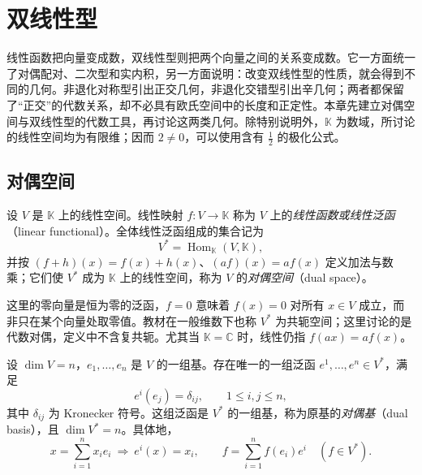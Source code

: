 \setcounter{chapter}{9} %
\chapter{双线性型}
\label{chap:bilinear-forms}

线性函数把向量变成数，双线性型则把两个向量之间的关系变成数。它一方面统一了对偶配对、二次型和实内积，另一方面说明：改变双线性型的性质，就会得到不同的几何。非退化对称型引出正交几何，非退化交错型引出辛几何；两者都保留了“正交”的代数关系，却不必具有欧氏空间中的长度和正定性。本章先建立对偶空间与双线性型的代数工具，再讨论这两类几何。除特别说明外，$\mathbb K$ 为数域，所讨论的线性空间均为有限维；因而 $2\neq0$，可以使用含有 $\frac12$ 的极化公式。

\section{对偶空间}
\label{sec:bilinear-dual-space}

\begin{definition}
\label{def:bilinear-dual-space}
设 $V$ 是 $\mathbb K$ 上的线性空间。线性映射 $f:V\to\mathbb K$ 称为 $V$ 上的\emph{线性函数或线性泛函}（linear functional）。全体线性泛函组成的集合记为
\[
    V^*=\operatorname{Hom}_{\mathbb K}(V,\mathbb K),
\]
并按 $(f+h)(x)=f(x)+h(x)$、$(af)(x)=af(x)$ 定义加法与数乘；它们使 $V^*$ 成为 $\mathbb K$ 上的线性空间，称为 $V$ 的\emph{对偶空间}（dual space）。
\end{definition}

这里的零向量是恒为零的泛函，$f=0$ 意味着 $f(x)=0$ 对所有 $x\in V$ 成立，而非只在某个向量处取零值。教材在一般维数下也称 $V^*$ 为共轭空间；这里讨论的是代数对偶，定义中不含复共轭。尤其当 $\mathbb K=\mathbb C$ 时，线性仍指 $f(ax)=af(x)$。

\begin{theorem}
\label{thm:bilinear-dual-basis}
设 $\dim V=n$，$e_1,\ldots,e_n$ 是 $V$ 的一组基。存在唯一的一组泛函 $e^1,\ldots,e^n\in V^*$，满足
\[
    e^i(e_j)=\delta_{ij},\qquad 1\leq i,j\leq n,
\]
其中 $\delta_{ij}$ 为 Kronecker 符号。这组泛函是 $V^*$ 的一组基，称为原基的\emph{对偶基}（dual basis），且 $\dim V^*=n$。具体地，
\begin{equation}
\label{eq:bilinear-dual-expansion}
    x=\sum_{i=1}^n x_i e_i\ \Longrightarrow\ e^i(x)=x_i,
    \qquad f=\sum_{i=1}^n f(e_i)e^i\quad(f\in V^*).
\end{equation}
\end{theorem}

